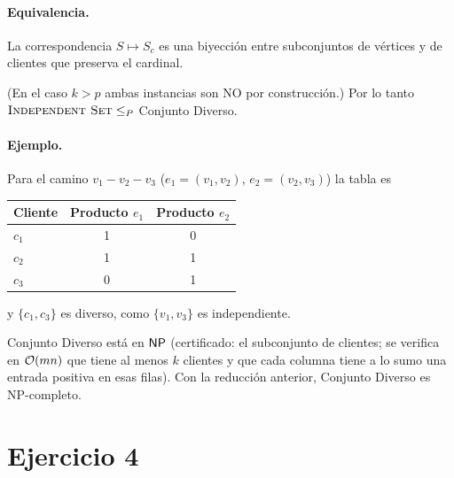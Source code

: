 \paragraph{Equivalencia.} La correspondencia $S\mapsto S_c$ es una biyección entre subconjuntos de vértices y
de clientes que preserva el cardinal.
(En el caso $k>p$ ambas instancias son NO por construcción.) Por lo tanto $\textsc{Independent Set}\le_P$ Conjunto Diverso.

\paragraph{Ejemplo.} Para el camino $v_1 - v_2 - v_3$ ($e_1=(v_1,v_2)$, $e_2=(v_2,v_3)$) la tabla es
\begin{center}
\begin{tabular}{lcc}
\toprule
Cliente & Producto $e_1$ & Producto $e_2$\\
\midrule
$c_1$ & 1 & 0\\
$c_2$ & 1 & 1\\
$c_3$ & 0 & 1\\
\bottomrule
\end{tabular}
\end{center}
y $\{c_1,c_3\}$ es diverso, como $\{v_1,v_3\}$ es independiente.

\begin{observacion}
Conjunto Diverso está en $\mathsf{NP}$ (certificado: el subconjunto de clientes; se verifica en $\mathcal{O}(mn)$ que tiene
al menos $k$ clientes y que cada columna tiene a lo sumo una entrada positiva en esas filas). Con la
reducción anterior, Conjunto Diverso es NP-completo.
\end{observacion}

\section{Ejercicio 4}

